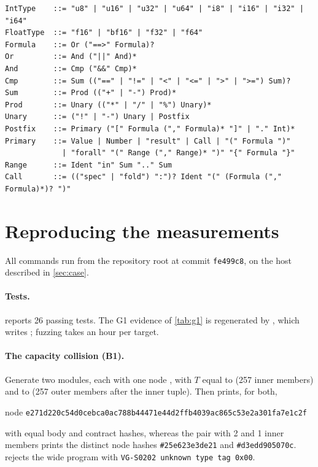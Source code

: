\begin{lstlisting}[language={},basicstyle=\ttfamily\scriptsize,frame=lines]
IntType    ::= "u8" | "u16" | "u32" | "u64" | "i8" | "i16" | "i32" | "i64"
FloatType  ::= "f16" | "bf16" | "f32" | "f64"
Formula    ::= Or ("==>" Formula)?
Or         ::= And ("||" And)*
And        ::= Cmp ("&&" Cmp)*
Cmp        ::= Sum (("==" | "!=" | "<" | "<=" | ">" | ">=") Sum)?
Sum        ::= Prod (("+" | "-") Prod)*
Prod       ::= Unary (("*" | "/" | "%") Unary)*
Unary      ::= ("!" | "-") Unary | Postfix
Postfix    ::= Primary ("[" Formula ("," Formula)* "]" | "." Int)*
Primary    ::= Value | Number | "result" | Call | "(" Formula ")"
             | "forall" "(" Range ("," Range)* ")" "{" Formula "}"
Range      ::= Ident "in" Sum ".." Sum
Call       ::= (("spec" | "fold") ":")? Ident "(" (Formula ("," Formula)*)? ")"
\end{lstlisting}

\section{Reproducing the measurements}\label{app:repro}

All commands run from the repository root at commit \texttt{fe499c8}, on the host described in
\cref{sec:case}.

\paragraph{Tests.}  reports 26 passing tests. The G1
evidence of \cref{tab:g1} is regenerated by , which writes
; fuzzing takes an hour per target.

\paragraph{The capacity collision (B1).} Generate two modules, each with one node
,
with $T$ equal to  (257 inner members) and to
 (257 outer members after the inner tuple). Then
 prints, for both,
\begin{center}\footnotesize
node \texttt{e271d220c54d0cebca0ac788b44471e44d2ffb4039ac865c53e2a301fa7e1c2f}
\end{center}
with equal body and contract hashes, whereas the pair with 2 and 1 inner members prints the
distinct node hashes \texttt{\#25e623e3de21} and \texttt{\#d3edd905070c}.
 rejects the wide program with \texttt{VG-S0202 unknown type tag 0x00}.

